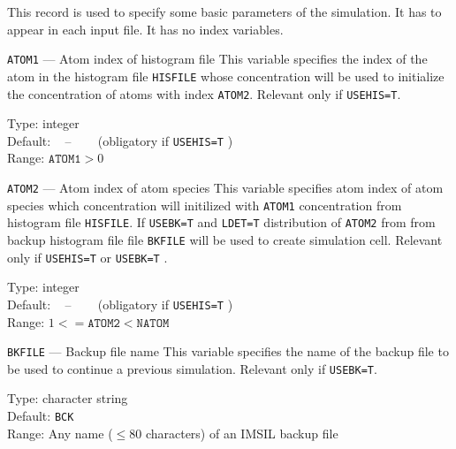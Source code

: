 This record is used to specify some basic parameters of the
simulation.  It has to appear in each input file.  It has no index
variables.

\begin{keydescription}{\texttt{ATOM1} --- Atom index of histogram file}
%
  This variable specifies the index of the atom in the histogram file 
  \texttt{HISFILE} whose concentration will be used to initialize the
  concentration of atoms with index \texttt{ATOM2}. Relevant only if 
  \texttt{USEHIS=T}.
%
  \begin{keytab}
    Type:    \> integer \\
    Default: \> ~ -- ~~~ (obligatory if \texttt{USEHIS=T} ) \\
    Range:   \>  $\texttt{ATOM1} > 0$
  \end{keytab}
\end{keydescription}

\begin{keydescription}{\texttt{ATOM2} --- Atom index of atom species}
%
  This variable specifies atom index of atom species which concentration will
  initilized with \texttt{ATOM1} concentration from histogram file
  \texttt{HISFILE}. 
  \ifprivate
  If \texttt{USEBK=T} and \texttt{LDET=T} distribution of
  \texttt{ATOM2} from from backup histogram file file \texttt{BKFILE} will be
  used to create simulation cell. 
  \fi
  Relevant only if \texttt{USEHIS=T} 
  \ifprivate
  or \texttt{USEBK=T}
  \fi
  .
%
  \begin{keytab}
    Type:    \> integer \\
    Default: \> ~ -- ~~~ (obligatory if \texttt{USEHIS=T} ) \\
    Range:   \>  $1 <= \texttt{ATOM2} < \texttt{NATOM}$
  \end{keytab}
\end{keydescription}

\begin{keydescription}{\texttt{BKFILE} --- Backup file name}
%
  This variable specifies the name of the backup file to be used to continue 
  a previous simulation. Relevant only if \texttt{USEBK=T}.
%
  \begin{keytab}
    Type:    \> character string \\
    Default: \> \texttt{BCK} \\
    Range:   \> Any name ($\le 80$ characters) of an IMSIL backup file 
  \end{keytab}
\end{keydescription}

